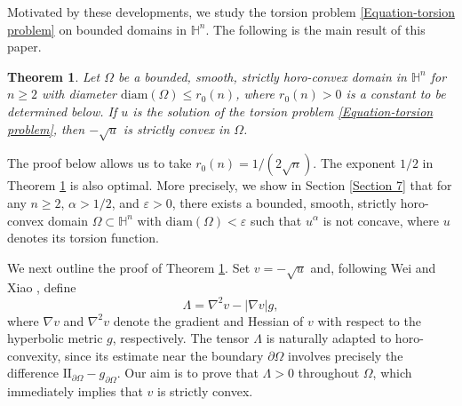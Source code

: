 \documentclass[11pt]{amsart}
\newtheorem{theorem}{Theorem}
\numberwithin{theorem}{section}
\numberwithin{equation}{section}
\begin{document}
Motivated by these developments, we study the torsion problem \eqref{Equation-torsion problem} on bounded domains in $\mathbb{H}^n$. The following is the main result of this paper.

\begin{theorem}\label{Theorem-main theorem}
Let $\Omega$ be a bounded, smooth, strictly horo-convex domain in $\mathbb{H}^n$ for $n\geq 2$ with diameter $\mathrm{diam}(\Omega)\leq r_0(n)$, where $r_0(n)>0$ is a constant to be determined below. If $u$ is the solution of the torsion problem \eqref{Equation-torsion problem}, then $-\sqrt{u}$ is strictly convex in $\Omega$.
\end{theorem}

The proof below allows us to take $r_0(n)=1/(2\sqrt{n})$. The exponent $1/2$ in Theorem \ref{Theorem-main theorem} is also optimal. More precisely, we show in Section \ref{Section 7} that for any $n\geq 2$, $\alpha>1/2$, and $\varepsilon>0$, there exists a bounded, smooth, strictly horo-convex domain $\Omega\subset\mathbb{H}^n$ with $\mathrm{diam}(\Omega)<\varepsilon$ such that $u^\alpha$ is not concave, where $u$ denotes its torsion function.

We next outline the proof of Theorem \ref{Theorem-main theorem}. Set $v=-\sqrt{u}$ and, following Wei and Xiao \cite{Wei-Xiao2025}, define
\begin{equation}\label{Tensor}
\Lambda=\nabla^2v-|\nabla v|g,
\end{equation}
where $\nabla v$ and $\nabla^2v$ denote the gradient and Hessian of $v$ with respect to the hyperbolic metric $g$, respectively. The tensor $\Lambda$ is naturally adapted to horo-convexity, since its estimate near the boundary $\partial\Omega$ involves precisely the difference $\mathrm{II}_{\partial\Omega}-g_{\partial\Omega}$. Our aim is to prove that $\Lambda>0$ throughout $\Omega$, which immediately implies that $v$ is strictly convex. 
\end{document}

